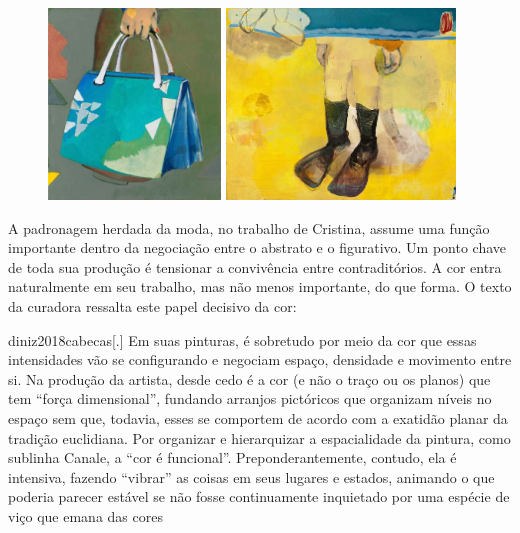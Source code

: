 \begin{figure}
	\begin{minipage}{.45\linewidth}
		\caption{}
		\includegraphics[height=2in]{figuras/canale-geoportatil-2016.pdf.compressed.pdf}
	\end{minipage}\hfill
	\begin{minipage}{.45\linewidth}
		\caption{}
		\includegraphics[height=2in]{figuras/canale-submarino-2012.pdf.compressed.pdf}
	\end{minipage}
\end{figure}

A padronagem herdada da moda, no trabalho de Cristina, assume uma
função importante dentro da negociação entre o abstrato e o figurativo.
Um ponto chave de toda sua produção é tensionar a convivência entre
contraditórios. A cor entra naturalmente em seu trabalho, mas não menos
importante, do que forma. O texto da curadora \textcite{diniz2018cabecas} ressalta
este papel decisivo da cor:

\begin{displaycquote}{diniz2018cabecas}[.]
	Em suas pinturas, é sobretudo por meio da cor que essas intensidades vão
	se configurando e negociam espaço, densidade e movimento entre si. Na
	produção da artista, desde cedo é a cor (e não o traço ou os planos) que
	tem \enquote{força dimensional}, fundando arranjos pictóricos que organizam
	níveis no espaço sem que, todavia, esses se comportem de acordo com a
	exatidão planar da tradição euclidiana. Por organizar e hierarquizar a
	espacialidade da pintura, como sublinha Canale, a \enquote{cor é funcional}.
	Preponderantemente, contudo, ela é intensiva, fazendo \enquote{vibrar} as
	coisas em seus lugares e estados, animando o que poderia parecer estável
	se não fosse continuamente inquietado por uma espécie de viço que emana
	das cores
\end{displaycquote}

